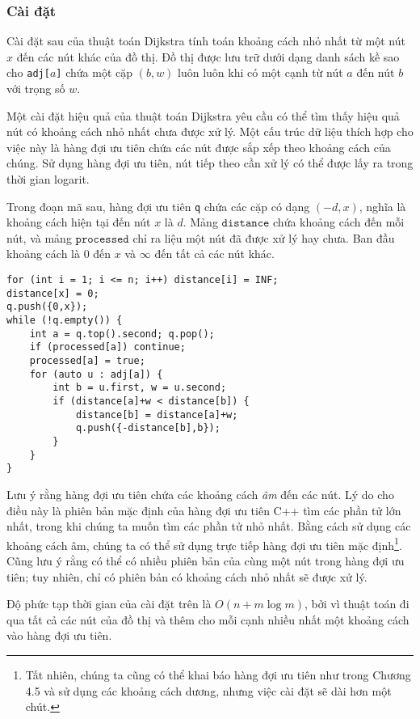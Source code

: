\subsubsection{Cài đặt}

Cài đặt sau của thuật toán Dijkstra
tính toán khoảng cách nhỏ nhất từ một nút $x$
đến các nút khác của đồ thị.
Đồ thị được lưu trữ dưới dạng danh sách kề
sao cho \texttt{adj[$a$]} chứa một cặp $(b,w)$
luôn luôn khi có một cạnh từ nút $a$ đến nút $b$
với trọng số $w$.

Một cài đặt hiệu quả của thuật toán Dijkstra
yêu cầu có thể tìm thấy hiệu quả
nút có khoảng cách nhỏ nhất chưa được xử lý.
Một cấu trúc dữ liệu thích hợp cho việc này là hàng đợi ưu tiên
chứa các nút được sắp xếp theo khoảng cách của chúng.
Sử dụng hàng đợi ưu tiên, nút tiếp theo cần xử lý
có thể được lấy ra trong thời gian logarit.

Trong đoạn mã sau, hàng đợi ưu tiên
\texttt{q} chứa các cặp có dạng $(-d,x)$,
nghĩa là khoảng cách hiện tại đến nút $x$ là $d$.
Mảng $\texttt{distance}$ chứa khoảng cách đến
mỗi nút, và mảng $\texttt{processed}$ chỉ ra
liệu một nút đã được xử lý hay chưa.
Ban đầu khoảng cách là $0$ đến $x$ và $\infty$ đến tất cả các nút khác.

\begin{lstlisting}
for (int i = 1; i <= n; i++) distance[i] = INF;
distance[x] = 0;
q.push({0,x});
while (!q.empty()) {
    int a = q.top().second; q.pop();
    if (processed[a]) continue;
    processed[a] = true;
    for (auto u : adj[a]) {
        int b = u.first, w = u.second;
        if (distance[a]+w < distance[b]) {
            distance[b] = distance[a]+w;
            q.push({-distance[b],b});
        }
    }
}
\end{lstlisting}

Lưu ý rằng hàng đợi ưu tiên chứa các khoảng cách \emph{âm}
đến các nút.
Lý do cho điều này là phiên bản
mặc định của hàng đợi ưu tiên C++ tìm các phần tử
lớn nhất, trong khi chúng ta muốn tìm các phần tử nhỏ nhất.
Bằng cách sử dụng các khoảng cách âm,
chúng ta có thể sử dụng trực tiếp hàng đợi ưu tiên mặc định\footnote{Tất nhiên,
chúng ta cũng có thể khai báo hàng đợi ưu tiên như trong Chương 4.5
và sử dụng các khoảng cách dương, nhưng việc cài đặt sẽ dài hơn một chút.}.
Cũng lưu ý rằng có thể có nhiều phiên bản của cùng một
nút trong hàng đợi ưu tiên; tuy nhiên, chỉ có phiên bản có
khoảng cách nhỏ nhất sẽ được xử lý.

Độ phức tạp thời gian của cài đặt trên là
$O(n+m \log m)$, bởi vì thuật toán đi qua
tất cả các nút của đồ thị và thêm cho mỗi cạnh
nhiều nhất một khoảng cách vào hàng đợi ưu tiên.


